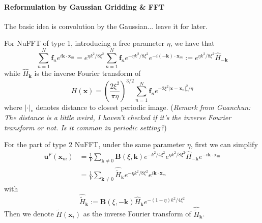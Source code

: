 \documentclass{article}[12pt]
\begin{document}
\paragraph{Reformulation by Gaussian Gridding \& FFT} 
The basic idea is convolution by the Gaussian... leave it for later.

For NuFFT of type 1, introducing a free parameter $\eta$, we have that
\begin{equation}
\sum_{n=1}^{N} \mathbf{f}_n e ^{i \mathbf{k} \cdot \mathbf{x}_m }  = e^{\eta k^2 / 8 \xi^2} \sum_{n=1}^{N} \mathbf{f}_n e^{-\eta k^2 / 8 \xi^2} e ^{-i (\mathbf{-k}) \cdot \mathbf{x}_m }  := e^{\eta k^2 / 8 \xi^2} \hat{H}_{\mathbf{-k}}
\end{equation}
while $\hat{H}_{\mathbf{k}}$ is the inverse Fourier transform of 
\begin{equation}
H(\mathbf{x}) = \left(\frac{2 \xi^2}{\pi \eta}\right)^{3/2}  \sum_{n=1}^N \mathbf{f}_n e^{-2 \xi^2 |\mathbf{x} - \mathbf{x}_n|_{\ast}^2 / \eta} \label{eq:gaussian_gridding_1}
\end{equation}
where $|\cdot|_{\ast}$ denotes distance to closest periodic image. (\textit{Remark from Guanchun: The distance is a little weird, I haven't checked if it's the inverse Fourier transform or not. Is it common in periodic setting?})

For the part of type 2 NuFFT, under the same parameter $\eta$, first we can simplify 
\begin{align}
\mathbf{u}^F (\mathbf{x}_m) & = \frac{1}{V} \sum_{\mathbf{k} \neq 0} \mathbf{B}(\xi, \mathbf{k}) e^{-k^2/4\xi^2} e^{\eta k^2 / 8 \xi^2} \hat{H}_{\mathbf{-k}} e ^{-i \mathbf{k} \cdot \mathbf{x}_m} \\
& = \frac{1}{V} \sum_{\mathbf{k} \neq 0} \hat{\tilde{H}}_{\mathbf{k}} e^{- \eta k^2 / 8 \xi^2}  e ^{i \mathbf{k} \cdot \mathbf{x}_m} 
\end{align}
with 
\begin{equation}
\hat{\tilde{H}}_{\mathbf{k}} := \mathbf{B}(\xi, \mathbf{-k}) \hat{H}_{\mathbf{k}} e^{-(1-\eta)k^2 / 4\xi^2} \label{eq:hat_tilde_h_formula}
\end{equation}
Then we denote $\tilde{H}(\mathbf{x}_i)$ as the inverse Fourier transform of $
\hat{\tilde{H}}_{\mathbf{k}}$.
\end{document}
